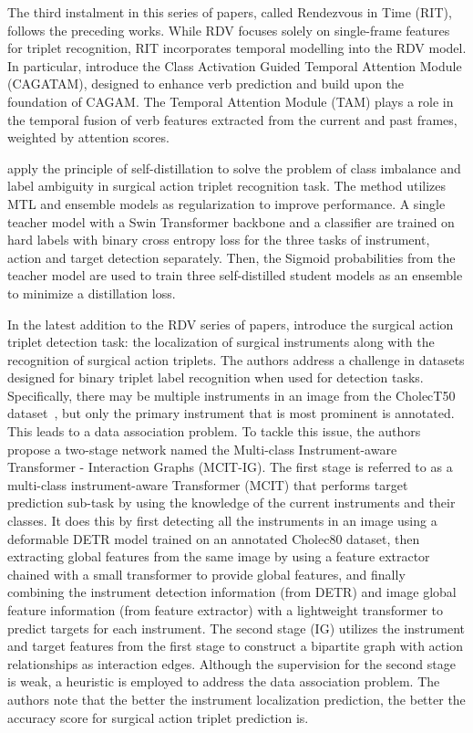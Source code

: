 \documentclass[times,twocolumn,final]{elsarticle}
\begin{document}
The third instalment in this series of papers, \citet{sharma2022RendezvousInTime} called Rendezvous in Time (RIT), follows the preceding works. While RDV focuses solely on single-frame features for triplet recognition, RIT incorporates temporal modelling into the RDV model.
In particular, \citet{sharma2022RendezvousInTime} introduce the Class Activation Guided Temporal Attention Module (CAGATAM), designed to enhance verb prediction and build upon the foundation of CAGAM. The Temporal Attention Module (TAM) plays a role in the temporal fusion of verb features extracted from the current and past frames, weighted by attention scores.

\citet{multi_self_distillation} apply the principle of self-distillation to solve the problem of class imbalance and label ambiguity in surgical action triplet recognition task. The method utilizes MTL and ensemble models as regularization to improve performance. A single teacher model with a Swin Transformer \citep{liu2021Swin} backbone and a classifier are trained on hard labels with binary cross entropy loss for the three tasks of instrument, action and target detection separately. Then, the Sigmoid probabilities from the teacher model are used to train three self-distilled student models as an ensemble to minimize a distillation loss.      

In the latest addition to the RDV series of papers, \citet{sharma2023surgical} introduce the surgical action triplet detection task: the localization of surgical instruments along with the recognition of surgical action triplets. 
The authors address a challenge in datasets designed for binary triplet label recognition when used for detection tasks.
Specifically, there may be multiple instruments in an image from the CholecT50 dataset~\citep{NWOYE2022102433_rendevous}, but only the primary instrument that is most prominent is annotated. This leads to a data association problem. 
To tackle this issue, the authors propose a two-stage network named the Multi-class Instrument-aware Transformer - Interaction Graphs (MCIT-IG). The first stage is referred to as a multi-class instrument-aware Transformer (MCIT) that performs target prediction sub-task by using the knowledge of the current instruments and their classes. It does this by first detecting all the instruments in an image using a deformable DETR model \citep{zhu2021deformable} trained on an annotated Cholec80 dataset, then extracting global features from the same image by using a feature extractor chained with a small transformer to provide global features, and finally combining the instrument detection information (from DETR) and image global feature information (from feature extractor) with a lightweight transformer to predict targets for each instrument. 
The second stage (IG) utilizes the instrument and target features from the first stage to construct a bipartite graph with action relationships as interaction edges. Although the supervision for the second stage is weak, a heuristic is employed to address the data association problem.
The authors note that the better the instrument localization prediction, the better the accuracy score for surgical action triplet prediction is. \newline
\end{document}
